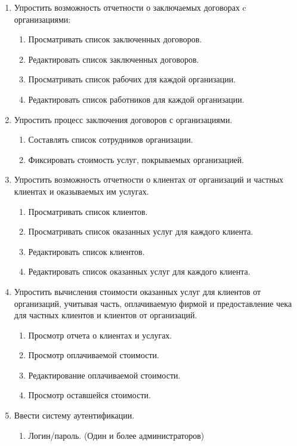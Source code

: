 \documentclass[a4paper,12pt]{article}
\begin{document}
\begin{enumerate}

\item Упростить возможность отчетности о заключаемых договорах c организациями:
\begin{enumerate}
\item  Просматривать список заключенных договоров.

\item Редактировать список заключенных договоров.

\item Просматривать список рабочих для каждой организации.

\item  Редактировать список работников для каждой организации.
\end{enumerate}
\item Упростить процесс заключения договоров с организациями.
\begin{enumerate}
\item Составлять список сотрудников организации.

\item Фиксировать стоимость услуг, покрываемых организацией.
\end{enumerate}




\item Упростить возможность отчетности о клиентах от организаций и частных клиентах и оказываемых им услугах.
\begin{enumerate}
\item Просматривать список клиентов.

\item Просматривать список оказанных услуг для каждого клиента.

\item Редактировать список клиентов.

\item  Редактировать список оказанных услуг для каждого клиента.
\end{enumerate}
\item Упростить вычисления стоимости оказанных услуг для клиентов от организаций, учитывая часть, оплачиваемую фирмой и предоставление чека для частных клиентов и клиентов от организаций.
\begin{enumerate}
\item  Просмотр отчета о клиентах и услугах.

\item  Просмотр оплачиваемой стоимости.
\item  Редактирование оплачиваемой стоимости.

\item  Просмотр оставшейся стоимости.
\end{enumerate}
\item  Ввести систему аутентификации.
\begin{enumerate}
\item   Логин/пароль. (Один и более администраторов)
\end{enumerate}

\end{enumerate}
\end{document}

